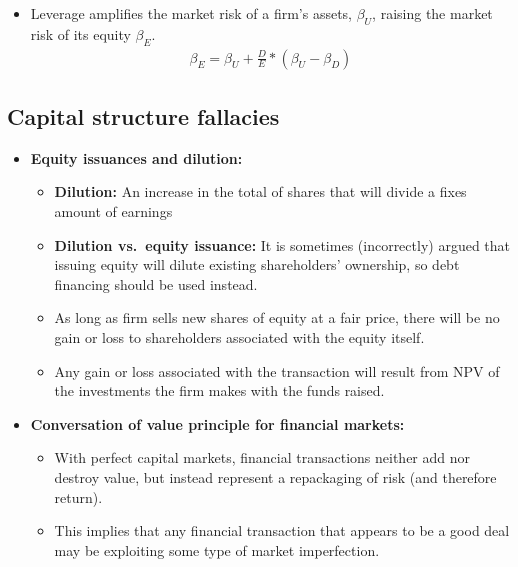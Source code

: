 \documentclass[ieeetran]{article}
\begin{document}
\begin{itemize}
\begin{itemize}
	  \item Leverage amplifies the market risk of a firm's assets, $\beta_U$, raising the market risk of its equity $\beta_E$.
		  \large
		  \begin{equation*}
		  \boxed{
		  \begin{aligned}
		 \beta_E = \beta_U + \frac{D}{E} * (\beta_U - \beta_D) 
		  \end{aligned}
		  }
		  \end{equation*}
		  \normalsize
		  
	\end{itemize}
\end{itemize}

\subsection{Capital structure fallacies} %
\label{sub:capital_structure_fallacies}
\begin{itemize}
  \item \textbf{Equity issuances and dilution:}
	  \begin{itemize}
	    \item \textbf{Dilution:} An increase in the total of shares that will divide a fixes amount of earnings
	\item \textbf{Dilution vs.\ equity issuance:} It is sometimes (incorrectly) argued that issuing equity will dilute existing shareholders' ownership, so debt financing should be used instead.
         \item As long as firm sells new shares of equity at a fair price, there will be no gain or loss to shareholders associated with the equity itself.
	 \item Any gain or loss associated with the transaction will result from NPV of the investments the firm makes with the funds raised. 
         
	  \end{itemize}

\item \textbf{Conversation of value principle for financial markets:}
	\begin{itemize}
	  \item With perfect capital markets, financial transactions neither add nor destroy value, but instead represent a repackaging of risk (and therefore return).
	  \item This implies that any financial transaction that appears to be a good deal may be exploiting some type of market imperfection.
	\end{itemize}
\end{itemize}
\end{document}
